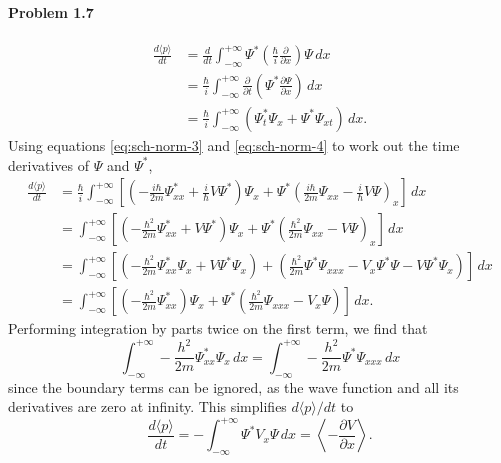 \documentclass{article}
\begin{document}
\paragraph{Problem 1.7}
\begin{align*}
  \frac{d\langle p \rangle}{dt}
  &= \frac{d}{dt} \int_{-\infty}^{+\infty} \Psi^* \left(
    \frac{\hbar}{i}\frac{\partial}{\partial x}
  \right) \Psi \,dx \\
  &= \frac{\hbar}{i} \int_{-\infty}^{+\infty} \frac{\partial}{\partial t}
  \left(
    \Psi^*\frac{\partial \Psi}{\partial x}
  \right) \,dx \\
  &= \frac{\hbar}{i} \int_{-\infty}^{+\infty} \left(
    \Psi^*_t \Psi_x + \Psi^* \Psi_{xt}
  \right) \,dx.
\end{align*}
Using equations \eqref{eq:sch-norm-3} and \eqref{eq:sch-norm-4} to work out the
time derivatives of $\Psi$ and $\Psi^*$,
\begin{align*}
  \frac{d\langle p \rangle}{dt}
  &= \frac{\hbar}{i} \int_{-\infty}^{+\infty} \left[
    \left(
      -\frac{i\hbar}{2m} \Psi^*_{xx} + \frac{i}{\hbar} V \Psi^*
    \right) \Psi_x + \Psi^* \left(
      \frac{i\hbar}{2m} \Psi_{xx} - \frac{i}{\hbar} V \Psi
    \right)_x
  \right] \,dx \\
  &= \int_{-\infty}^{+\infty} \left[
    \left(
      -\frac{\hbar^2}{2m} \Psi^*_{xx} + V\Psi^*
    \right) \Psi_x + \Psi^* \left(
      \frac{\hbar^2}{2m} \Psi_{xx} - V\Psi
    \right)_x
  \right] \,dx \\
  &= \int_{-\infty}^{+\infty} \left[
    \left(
      -\frac{\hbar^2}{2m} \Psi^*_{xx} \Psi_x + V \Psi^* \Psi_x
    \right) + \left(
      \frac{\hbar^2}{2m} \Psi^* \Psi_{xxx} - V_x \Psi^* \Psi - V \Psi^* \Psi_x
    \right)
  \right] \,dx \\
  &= \int_{-\infty}^{+\infty} \left[
    \left( -\frac{\hbar^2}{2m} \Psi^*_{xx} \right) \Psi_x
    + \Psi^* \left( \frac{\hbar^2}{2m} \Psi_{xxx} - V_x \Psi \right)
  \right] \,dx.
\end{align*}
Performing integration by parts twice on the first term, we find that \[
  \int_{-\infty}^{+\infty} -\frac{h^2}{2m} \Psi^*_{xx} \Psi_x \,dx
  = \int_{-\infty}^{+\infty} -\frac{h^2}{2m} \Psi^* \Psi_{xxx} \,dx
\]
since the boundary terms can be ignored, as the wave function and all its
derivatives are zero at infinity. This simplifies $d\langle p \rangle/dt$ to \[
  \frac{d\langle p \rangle}{dt}
  = -\int_{-\infty}^{+\infty} \Psi^* V_x \Psi \,dx
  = \left\langle -\frac{\partial V}{\partial x} \right\rangle.
\]
\end{document}
